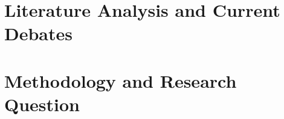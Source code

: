 \section{Literature Analysis and Current Debates}\label{chap:Literatur Analysis}
%
%
%
%
%
%
%
\section{Methodology and Research Question}\label{sec:Methodology and Research Question}

